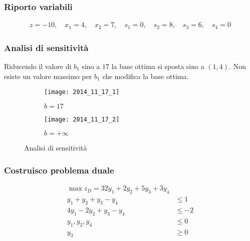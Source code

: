 \documentclass[\main/main.tex]{subfiles}
\begin{document}
\subsubsection*{Riporto variabili}

\begin{align*}
  z = -10, \quad
  x_1 = 4, \quad
  x_2 = 7, \quad
  s_1 = 0, \quad
  s_2 = 8, \quad
  s_3 = 6, \quad
  s_4 = 0
\end{align*}
\subsubsection*{Analisi di sensitività}
Riducendo il valore di $b_1$ sino a $17$ la base ottima si sposta sino a $(1,4)$. Non esiste un valore massimo per $b_1$ che modifica la base ottima.
\begin{figure}
  \begin{subfigure}{0.49\textwidth}
    \texttt{[image: 2014\_11\_17\_1]}
    \caption{$b=17$}
  \end{subfigure}
  \begin{subfigure}{0.49\textwidth}
    \texttt{[image: 2014\_11\_17\_2]}
    \caption{$b=+\infty$}
  \end{subfigure}
  \caption{Analisi di sensitività}
\end{figure}

\subsubsection*{Costruisco problema duale}
\begin{align*}
  \max z_D = 32y_1 + 2y_2 + 5y_3 + 3y_4 \\
  y_1 + y_2 + y_3 -y_4  & \leq 1        \\
  4y_1 -2y_2 + y_3 -y_4 & \leq -2       \\
  y_1, y_2, y_4         & \leq 0        \\
  y_3                   & \geq 0
\end{align*}
\end{document}
